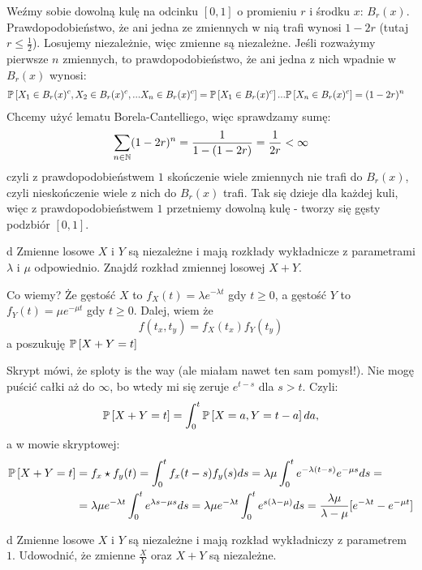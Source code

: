 \documentclass{article}
\begin{document}
Weźmy sobie dowolną kulę na odcinku $[0,1]$ o promieniu $r$ i środku $x$: $B_r(x)$. Prawdopodobieństwo, że ani jedna ze zmiennych w nią trafi wynosi $1-2r$ (tutaj $r\leq\frac12$). Losujemy niezależnie, więc zmienne są niezależne. Jeśli rozważymy pierwsze $n$ zmiennych, to prawdopodobieństwo, że ani jedna z nich wpadnie w $B_r(x)$ wynosi:
\begin{align*}
    \prob{X_1\in B_r(x)^c,X_2\in B_r(x)^c,...X_n\in B_r(x)^c}&=\prob{X_1\in B_r(x)^c}...\prob{X_n\in B_r(x)^c}=(1-2r)^n
\end{align*}
Chcemy użyć lematu Borela-Cantelliego, więc sprawdzamy sumę:
\begin{align*}
    \sum_{n\in\mathbb{N}}(1-2r)^n=\frac{1}{1-(1-2r)}=\frac{1}{2r}<\infty
\end{align*}
czyli z prawdopodobieństwem $1$ skończenie wiele zmiennych nie trafi do $B_r(x)$, czyli nieskończenie wiele z nich do $B_r(x)$ trafi. Tak się dzieje dla każdej kuli, więc z prawdopodobieństwem $1$ przetniemy dowolną kulę - tworzy się gęsty podzbiór $[0,1]$.

\begin{problem}[9]{d}
Zmienne losowe $X$ i $Y$ są niezależne i mają rozkłady wykładnicze z parametrami $\lambda$ i $\mu$ odpowiednio. Znajdź rozkład zmiennej losowej $X+Y$.
\end{problem}

Co wiemy? Że gęstość $X$ to $f_X(t)=\lambda e^{-\lambda t}$ gdy $t\geq 0$, a gęstość $Y$ to $f_Y(t)=\mu e^{-\mu t}$ gdy $t\geq 0$. Dalej, wiem że
$$f(t_x, t_y)=f_X(t_x)f_Y(t_y)$$
a poszukuję $\prob{X+Y=t}$

Skrypt mówi, że sploty is the way (ale miałam nawet ten sam pomysł!). Nie mogę puścić całki aż do $\infty$, bo wtedy mi się zeruje $e^{t-s}$ dla $s>t$. Czyli:
$$\prob{X+Y=t}=\int_0^t\prob{X=a, Y=t-a}da,$$
a w mowie skryptowej:
\begin{align*}
    \prob{X+Y=t}&=f_x\star f_y(t)=\int_0^t f_x(t-s)f_y(s)ds=\lambda\mu\int_0^t e^{-\lambda(t-s)}e^{-\mu s}ds=\\
    &=\lambda\mu e^{-\lambda t}\int_0^t e^{\lambda s-\mu s}ds=\lambda\mu e^{-\lambda t}\int_0^t e^{s(\lambda-\mu)}ds=\frac{\lambda\mu}{\lambda-\mu}[e^{-\lambda t}-e^{-\mu t}]
\end{align*}

\begin{problem}[10]{d}
Zmienne losowe $X$ i $Y$ są niezależne i mają rozkład wykładniczy z parametrem $1$. Udowodnić, że zmienne $\frac{X}{Y}$ oraz $X+Y$ są niezależne.
\end{problem}
\end{document}
